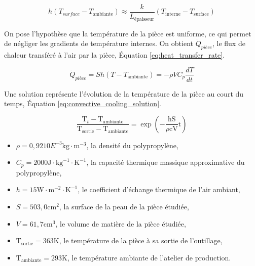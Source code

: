 \begin{equation} \label{eq:convective_cooling}
h\left(T_{surface}-T_{\text{ambiante}}\right) \approx \frac{k}{L_{\text{épaisseur}}}\left(T_{\text{interne}}-T_{\text{surface}}\right)
\end{equation}

On pose l'hypothèse que la température de la pièce est uniforme, ce qui permet de négliger les gradients de température internes.
On obtient $\dot{Q}_{\mathrm{\textit{pièce}}}$, le flux de chaleur transféré à l'air par la pièce, Équation \ref{eq:heat_transfer_rate}.

\begin{equation} \label{eq:heat_transfer_rate}
\dot{Q}_{\mathrm{\textit{pièce}}} = S h\left(T-T_{\text{ambiante}}\right)=-\rho V C_p \frac{d T}{d t}
\end{equation}

Une solution représente l'évolution de la température de la pièce au court du temps, Équation \ref{eq:convective_cooling_solution}.

\begin{equation}\label{eq:convective_cooling_solution}
\frac{\mathrm{T}_t-\mathrm{T}_{\text{ambiante}}}{\mathrm{T}_{\mathrm{sortie}}-\mathrm{T}_{\text{ambiante}}}=\exp \left(-\frac{\mathrm{hS}}{\rho \mathrm{c} \mathrm{V}} \mathrm{t}\right)
\end{equation}

\begin{itemize}
	\item $\rho = 0,92 10E^{-3} \text{kg}\cdot \text{m}^{-3}$, la densité du polypropylène,
	\item $C_p = 2000 \text{J}\cdot \text{kg}^{-1}\cdot \text{K}^{-1}$, la capacité thermique massique approximative du polypropylène,
	\item $h = 15 \text{W}\cdot \text{m}^{-2}\cdot \text{K}^{-1}$, le coefficient d'échange thermique de l'air ambiant,%
	\item $S = 503,0 \text{cm}^2$, la surface de la peau de la pièce étudiée,
	\item $V = 61,7 \text{cm}^3$, le volume de matière de la pièce étudiée,
	\item $\mathrm{T}_{\text{sortie}} = 363\text{K}$, le température de la pièce à sa sortie de l'outillage,
	\item $\mathrm{T}_{\text{ambiante}} = 293\text{K}$, le température ambiante de l'atelier de production.
\end{itemize}


